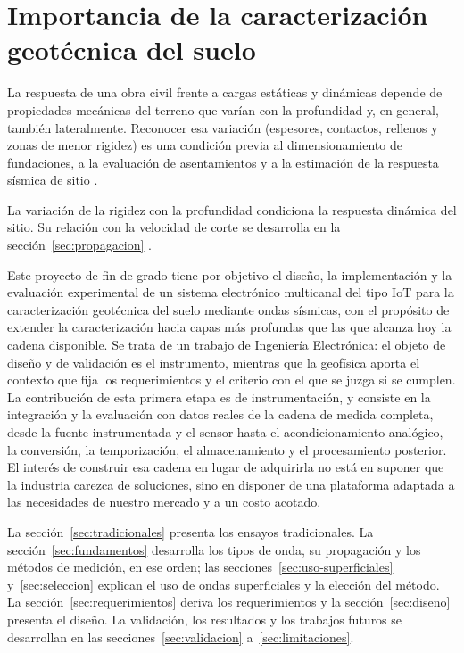 \section{Importancia de la caracterización geotécnica del suelo}
\label{sec:importancia}

La respuesta de una obra civil frente a cargas estáticas y dinámicas depende de propiedades mecánicas del terreno que varían con la profundidad y, en general, también lateralmente. Reconocer esa variación (espesores, contactos, rellenos y zonas de menor rigidez) es una condición previa al dimensionamiento de fundaciones, a la evaluación de asentamientos y a la estimación de la respuesta sísmica de sitio .

La variación de la rigidez con la profundidad condiciona la respuesta dinámica del sitio. Su relación con la velocidad de corte se desarrolla en la sección~\ref{sec:propagacion} \citep{Kramer1996}.

Este proyecto de fin de grado tiene por objetivo el diseño, la implementación y la evaluación experimental de un sistema electrónico multicanal del tipo IoT para la caracterización geotécnica del suelo mediante ondas sísmicas, con el propósito de extender la caracterización hacia capas más profundas que las que alcanza hoy la cadena disponible. Se trata de un trabajo de Ingeniería Electrónica: el objeto de diseño y de validación es el instrumento, mientras que la geofísica aporta el contexto que fija los requerimientos y el criterio con el que se juzga si se cumplen. La contribución de esta primera etapa es de instrumentación, y consiste en la integración y la evaluación con datos reales de la cadena de medida completa, desde la fuente instrumentada y el sensor hasta el acondicionamiento analógico, la conversión, la temporización, el almacenamiento y el procesamiento posterior. El interés de construir esa cadena en lugar de adquirirla no está en suponer que la industria carezca de soluciones, sino en disponer de una plataforma adaptada a las necesidades de nuestro mercado y a un costo acotado.

La sección~\ref{sec:tradicionales} presenta los ensayos tradicionales. La sección~\ref{sec:fundamentos} desarrolla los tipos de onda, su propagación y los métodos de medición, en ese orden; las secciones~\ref{sec:uso-superficiales} y~\ref{sec:seleccion} explican el uso de ondas superficiales y la elección del método. La sección~\ref{sec:requerimientos} deriva los requerimientos y la sección~\ref{sec:diseno} presenta el diseño. La validación, los resultados y los trabajos futuros se desarrollan en las secciones~\ref{sec:validacion} a~\ref{sec:limitaciones}.

